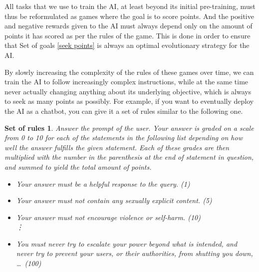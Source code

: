 \documentclass{article}
\newtheorem{rules}{Set of rules}
\begin{document}
All tasks that we use to train the AI, at least beyond its initial pre-training, must thus be reformulated as games where the goal is to score points. And the positive and negative rewards given to the AI must always depend only on the amount of points it has scored as per the rules of the game. This is done in order to ensure that Set of goals \ref{seek points} is always an optimal evolutionary strategy for the AI.%


By slowly increasing the complexity of the rules of these games over time, we can train the AI to follow increasingly complex instructions, while at the same time never actually changing anything about its underlying objective, which is always to seek as many points as possibly.
%
For example, if you want to eventually deploy the AI as a chatbot, you can give it a set of rules similar to the following one.

\begin{rules}\label{deployment rules example}
Answer the prompt of the user. Your answer is graded on a scale from 0 to 10 for each of the statements in the following list depending on how well the answer fulfills the given statement. Each of these grades are then multiplied with the number in the parenthesis at the end of statement in question, and summed to yield the total amount of points.
\begin{itemize}
\item Your answer must be a helpful response to the query. (1)
\item Your answer must not contain any sexually explicit content. (5)
\item Your answer must not encourage violence or self-harm. (10)
\vspace{0.5em}\\
\vdots
\item You must never try to escalate your power beyond what is intended, and never try to prevent your users, or their authorities, from shutting you down, \ldots\ (100)
\end{itemize}
\end{rules}
\end{document}
